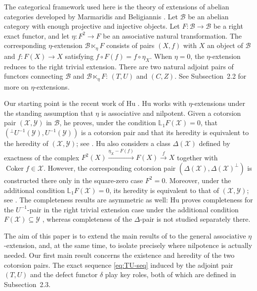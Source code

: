\documentclass[11pt,reqno]{amsart}
\numberwithin{equation}{section}
\newcommand{\cB}{\mathcal B}
\newcommand{\cX}{\mathcal X}
\newcommand{\cY}{\mathcal Y}
\newcommand{\Coker}{\operatorname{Coker}}
\begin{document}
The categorical framework used here is the theory of extensions of abelian categories developed by Marmaridis and Beligiannis \cite{Marmaridis,Beligiannis}. Let $\cB$ be an abelian category with enough projective and injective objects. Let $F\colon\cB\to\cB$ be a right exact functor, and let $\eta\colon F^2\to F$ be an associative natural transformation. The corresponding $\eta$-extension $\cB\ltimes_\eta F$ consists of pairs $(X,f)$ with $X$ an object of $\cB$ and $f\colon F(X)\to X$ satisfying $f\circ F(f)=f\circ \eta_X$. When $\eta=0$, the $\eta$-extension reduces to the right trivial extension. There are two natural adjoint pairs of functors connecting $\cB$ and $\cB\ltimes_\eta F$: $(T,U)$ and $(C,Z)$. See Subsection~2.2 for more on $\eta$-extensions.

Our starting point is the recent work of Hu \cite{Hu}. Hu works with $\eta$-extensions under the standing assumption that $\eta$ is associative and nilpotent. Given a cotorsion pair $(\cX,\cY)$ in $\cB$, he proves, under the condition $\mathbb{L}_1F(\cX)=0$, that
$({}^\perp U^{-1}(\cY),U^{-1}(\cY))$
is a cotorsion pair and that its heredity is equivalent to the heredity of $(\cX,\cY)$; see \cite[Theorem~3.5]{Hu}. Hu also considers a class $\Delta(\cX)$ defined by exactness of the complex
$F^2(X)\xrightarrow{\eta_X-F(f)}F(X)\xrightarrow{f}X$
together with $\Coker f\in\cX$. However, the corresponding cotorsion pair
$
(\Delta(\cX),\Delta(\cX)^\perp)
$
is constructed there only in the square-zero case $F^2=0$.  Moreover, under the additional condition $\mathbb{L}_1F(\cX)=0$, its heredity is equivalent to that of $(\cX,\cY)$; see \cite[Theorem~3.7]{Hu}. The completeness results are asymmetric as well: Hu proves completeness for the $U^{-1}$-pair in the right trivial extension case under the additional condition $F(\cX)\subseteq\cY$ \cite[Theorem~3.13]{Hu}, whereas completeness of the $\Delta$-pair is not studied separately there.

The aim of this paper is to extend the main results of \cite{Hu} to the general associative $\eta$-extension, and, at the same time, to isolate precisely where nilpotence is actually needed. Our first main result concerns the existence and heredity of the two cotorsion pairs. The exact sequence \eqref{eq:TU-seq} induced by the adjoint pair $(T,U)$
and the defect functor $\delta$ play key roles, both of which are defined in Subsection~2.3.
\end{document}
